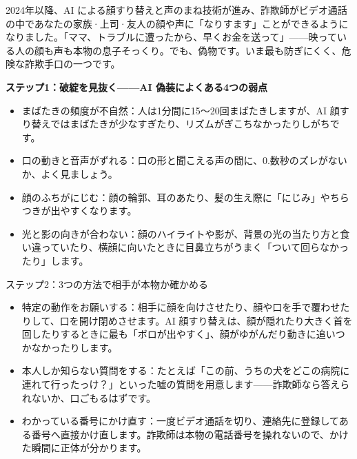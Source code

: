 
2024年以降、AI による顔すり替えと声のまね技術が進み、詐欺師がビデオ通話の中であなたの家族·上司·友人の顔や声に「なりすます」ことができるようになりました。「ママ、トラブルに遭ったから、早くお金を送って」——映っている人の顔も声も本物の息子そっくり。でも、偽物です。いま最も防ぎにくく、危険な詐欺手口の一つです。

\textbf{ステップ1：破綻を見抜く——AI 偽装によくある4つの弱点}\par

\begin{itemize}
  \item まばたきの頻度が不自然：人は1分間に15〜20回まばたきしますが、AI 顔すり替えではまばたきが少なすぎたり、リズムがぎこちなかったりしがちです。
  \item 口の動きと音声がずれる：口の形と聞こえる声の間に、0.数秒のズレがないか、よく見ましょう。
  \item 顔のふちがにじむ：顔の輪郭、耳のあたり、髪の生え際に「にじみ」やちらつきが出やすくなります。
  \item 光と影の向きが合わない：顔のハイライトや影が、背景の光の当たり方と食い違っていたり、横顔に向いたときに目鼻立ちがうまく「ついて回らなかったり」します。
\end{itemize}

\begin{tcbinfo}{ステップ2：3つの方法で相手が本物か確かめる}
\begin{itemize}
  \item 特定の動作をお願いする：相手に顔を向けさせたり、顔や口を手で覆わせたりして、口を開け閉めさせます。AI 顔すり替えは、顔が隠れたり大きく首を回したりするときに最も「ボロが出やすく」、顔がゆがんだり動きに追いつかなかったりします。
  \item 本人しか知らない質問をする：たとえば「この前、うちの犬をどこの病院に連れて行ったっけ？」といった嘘の質問を用意します——詐欺師なら答えられないか、口ごもるはずです。
  \item わかっている番号にかけ直す：一度ビデオ通話を切り、連絡先に登録してある番号へ直接かけ直します。詐欺師は本物の電話番号を操れないので、かけた瞬間に正体が分かります。
\end{itemize}

\end{tcbinfo}

